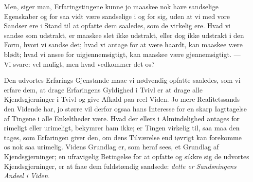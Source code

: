 \documentclass[12pt]{book}
\begin{document}
Men, siger man, Erfaringstingene kunne jo maaskee nok have sandselige
Egenskaber og for saa vidt være sandselige i og for sig, uden at vi med
vore Sandser ere i Stand til at opfatte dem saaledes, som de virkelig ere.
Hvad vi sandse som udstrakt, er maaskee slet ikke udstrakt, eller dog ikke
udstrakt i den Form, hvori vi sandse det; hvad vi antage for at være
haardt, kan maaskee være blødt; hvad vi ansee for uigjennemsigtigt, kan
maaskee være gjennemsigtigt. --- Vi svare: vel muligt, men hvad vedkommer
det os?

Den udvortes Erfarings Gjenstande maae vi nødvendig opfatte saaledes, som
vi erfare dem, at drage Erfaringens Gyldighed i Tvivl er at drage alle
Kjendsgjerninger i Tvivl og give Afkald paa reel Viden. Jo mere
Realitetssands den Vidende har, jo større vil derfor ogsaa hans Interesse
for en skarp Iagttagelse af Tingene i alle Enkeltheder være. Hvad der
ellers i Almindelighed antages for rimeligt eller urimeligt, bekymrer ham
ikke; er Tingen virkelig til, saa maa den tages, som Erfaringen giver den,
om dens Tilværelse end iøvrigt kan forekomme os nok saa urimelig. Videns
Grundlag er, som heraf sees, et Grundlag af Kjendsgjerninger; en
ufravigelig Betingelse for at opfatte og sikkre sig de udvortes
Kjendsgjerninger, er at faae dem fuldstændig sandsede: \emph{dette er
Sandsningens Andeel i Viden}.
\end{document}
